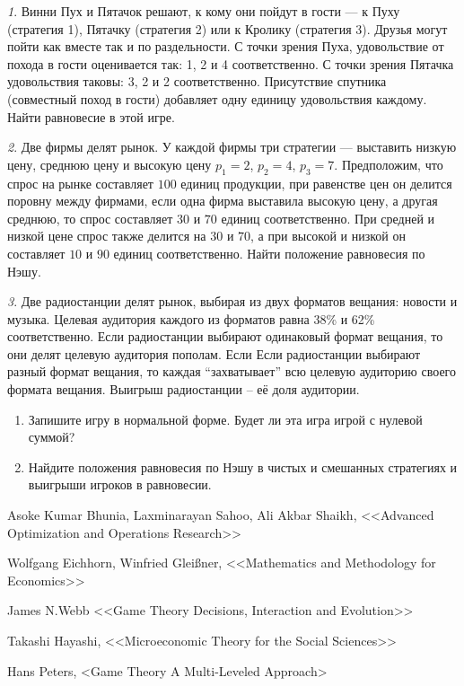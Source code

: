 \documentclass[12pt]{article}
\theoremstyle{remark}
\newtheorem{exercise}{}[subsection]
\begin{document}
\begin{exercise}
Винни Пух и Пятачок решают, к кому они пойдут в гости --- к Пуху
(стратегия 1), Пятачку (стратегия 2) или к Кролику (стратегия 3).
Друзья могут пойти как вместе так и по раздельности. С точки
зрения Пуха, удовольствие от похода в гости оценивается так: 1, 2
и 4 соответственно. С точки зрения Пятачка удовольствия таковы: 3,
2 и 2 соответственно. Присутствие спутника (совместный поход в
гости) добавляет одну единицу удовольствия каждому. Найти
равновесие в этой игре.
\end{exercise}

\begin{exercise}
Две фирмы делят рынок. У каждой фирмы три стратегии --- выставить
низкую цену, среднюю цену и высокую цену $p_1=2$, $p_2=4$,
$p_3=7$. Предположим, что спрос на рынке составляет $100$ единиц
продукции, при равенстве цен он делится поровну между фирмами,
если одна фирма выставила высокую цену, а другая среднюю, то спрос
составляет $30$ и $70$ единиц соответственно. При средней и низкой
цене спрос также делится на $30$ и $70$, а при высокой и низкой
он составляет $10$ и $90$ единиц соответственно. Найти положение
равновесия по Нэшу.
\end{exercise}

\begin{exercise}
Две радиостанции делят рынок, выбирая из двух форматов вещания: новости и музыка.
Целевая аудитория каждого из форматов равна 38\% и 62\% соответственно. Если радиостанции
выбирают одинаковый формат вещания, то они делят целевую аудитория пополам.
Если Если радиостанции выбирают разный формат вещания, то каждая ``захватывает''
всю целевую аудиторию своего формата вещания. Выигрыш радиостанции -- её доля аудитории.
\begin{enumerate}
	\item Запишите игру в нормальной форме. 
	Будет ли эта игра игрой с нулевой суммой? %
	\item Найдите положения равновесия по Нэшу в чистых и смешанных стратегиях
	и выигрыши игроков в равновесии.
\end{enumerate}
\end{exercise}

\begin{thebibliography}{99}

 Asoke Kumar Bhunia, Laxminarayan Sahoo, Ali Akbar Shaikh, 
<<Advanced Optimization and Operations Research>>

 Wolfgang Eichhorn, Winfried Gleißner, 
<<Mathematics and Methodology for Economics>>

 James N.Webb <<Game Theory Decisions, Interaction and Evolution>>

 Takashi Hayashi, <<Microeconomic Theory for the Social Sciences>>

 Hans Peters, <Game Theory A Multi-Leveled Approach>

\end{thebibliography}
\end{document}
